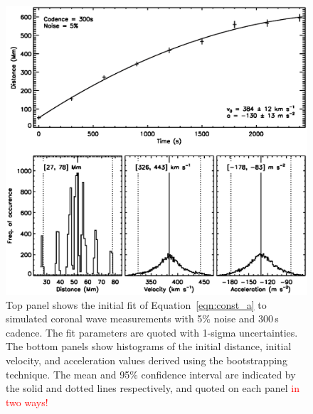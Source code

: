 \documentclass[structabstract]{aa}
\begin{document}
\begin{figure}
\begin{center}
\includegraphics[scale=0.45, trim=20 50 0 0, clip=true]{images/cad_boot_weight_5percent_300s.eps}
\caption{Top panel shows the initial fit of Equation~\ref{eqn:const_a} to simulated coronal wave measurements with 5\% noise and 300\,s cadence. The fit parameters are quoted with 1-sigma uncertainties. The bottom panels show histograms of the initial distance, initial velocity, and acceleration values derived using the bootstrapping technique. The mean and 95\% confidence interval are indicated by the solid and dotted lines respectively, and quoted on each panel \textcolor{red}{in two ways!}}
\label{cad_boot_weight}
\end{center}
\end{figure}
\end{document}
